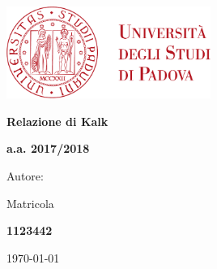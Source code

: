 \begin{titlepage} 
	\centering
	\includegraphics[width=0.50\textwidth]{img/logo.pdf}\par\vspace{1cm} %
	
	{\LARGE\bfseries Relazione di Kalk \par}
	\vspace{1cm}
	
	{\Large\bfseries a.a. 2017/2018 \par}
	
	\vspace{1cm} 

	Autore: \par
    {\bfseries \authorName \par} 
    Matricola {\bfseries 1123442 \par} 
	
	\vspace{1cm}

    
    \vfill
	
	{\large \today\par}
	
\end{titlepage}